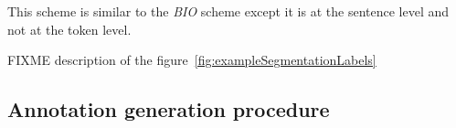 








%
This scheme is similar to the \textit{BIO} %
scheme except it is at the sentence level and not at the token level.


FIXME description of the figure~\ref{fig:exampleSegmentationLabels}




\subsection{Annotation generation procedure}
\label{}


